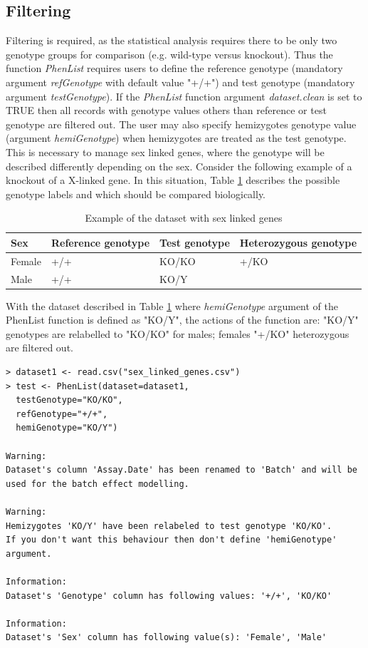 \documentclass[12pt,a4paper]{article}
\begin{document}
\subsection{Filtering}
\label{section:Filtering}
Filtering is required, as the statistical analysis requires there to be only two genotype groups for comparison (e.g. wild-type versus knockout). Thus the function \textit{PhenList} requires users to define the reference genotype (mandatory argument \textit{refGenotype} with default value "+\slash+") and test genotype (mandatory argument \textit{testGenotype}). 
If the \textit{PhenList} function argument \textit{dataset.clean} is set to TRUE then all records with genotype values others than reference or test genotype are filtered out. 
The user may also specify hemizygotes genotype value (argument \textit{hemiGenotype}) when hemizygotes are treated as the test genotype. 
This is necessary to manage sex linked genes, where the genotype will be described differently depending on the sex. 
Consider the following example of a knockout of a X-linked gene. In this situation, Table \ref{table:03} describes the possible genotype labels and which should be compared biologically.
\begin{table}[!h]
\begin{center}
\begin{tabular}{| l | l | l | l |}
  \hline
Sex&Reference genotype&Test genotype&Heterozygous genotype\\\hline
Female&+\slash +&KO\slash KO&+\slash KO\\
Male&+\slash +&KO\slash Y& \\
\hline  
\end{tabular}
\caption{Example of the dataset with sex linked genes}\label{table:03}
\end{center}
\end{table}

With the dataset described in Table \ref{table:03} where \textit{hemiGenotype} argument of the PhenList function is defined as "KO\slash Y", the actions of the function are:  "KO/Y" genotypes are relabelled to "KO/KO" for males;  females "+\slash KO" heterozygous are filtered out. 

\begingroup
    \fontsize{8pt}{12pt}\selectfont
\begin{verbatim}
> dataset1 <- read.csv("sex_linked_genes.csv")
> test <- PhenList(dataset=dataset1,
  testGenotype="KO/KO",
  refGenotype="+/+",
  hemiGenotype="KO/Y")
  
Warning:
Dataset's column 'Assay.Date' has been renamed to 'Batch' and will be used for the batch effect modelling.

Warning:
Hemizygotes 'KO/Y' have been relabeled to test genotype 'KO/KO'.
If you don't want this behaviour then don't define 'hemiGenotype' argument.

Information:
Dataset's 'Genotype' column has following values: '+/+', 'KO/KO'

Information:
Dataset's 'Sex' column has following value(s): 'Female', 'Male'
\end{verbatim}
\endgroup
\end{document}
